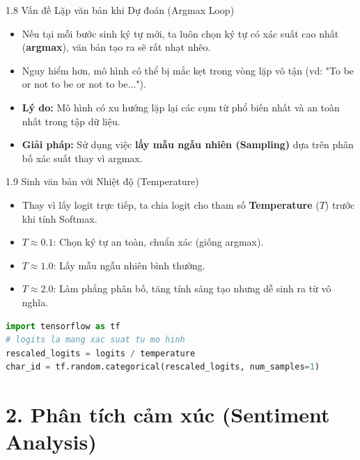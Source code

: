 \documentclass[aspectratio=169, 12pt]{beamer}
\begin{document}
\begin{frame}{1.8 Vấn đề Lặp văn bản khi Dự đoán (Argmax Loop)}
    \begin{itemize}
        \item Nếu tại mỗi bước sinh ký tự mới, ta luôn chọn ký tự có xác suất cao nhất (\textbf{argmax}), văn bản tạo ra sẽ rất nhạt nhẽo.
        \item Nguy hiểm hơn, mô hình có thể bị mắc kẹt trong vòng lặp vô tận (vd: "To be or not to be or not to be...").
        \item \textbf{Lý do:} Mô hình có xu hướng lặp lại các cụm từ phổ biến nhất và an toàn nhất trong tập dữ liệu.
        \item \textbf{Giải pháp:} Sử dụng việc \textbf{lấy mẫu ngẫu nhiên (Sampling)} dựa trên phân bố xác suất thay vì argmax.
    \end{itemize}
\end{frame}

\begin{frame}[fragile]{1.9 Sinh văn bản với Nhiệt độ (Temperature)}
    \begin{itemize}
        \item Thay vì lấy logit trực tiếp, ta chia logit cho tham số \textbf{Temperature} ($T$) trước khi tính Softmax.
        \item $T \approx 0.1$: Chọn ký tự an toàn, chuẩn xác (giống argmax).
        \item $T \approx 1.0$: Lấy mẫu ngẫu nhiên bình thường.
        \item $T \approx 2.0$: Làm phẳng phân bố, tăng tính sáng tạo nhưng dễ sinh ra từ vô nghĩa.
    \end{itemize}
\begin{lstlisting}[language=Python]
import tensorflow as tf
# logits la mang xac suat tu mo hinh
rescaled_logits = logits / temperature
char_id = tf.random.categorical(rescaled_logits, num_samples=1)
\end{lstlisting}
\end{frame}

\section{2. Phân tích cảm xúc (Sentiment Analysis)}
\end{document}
